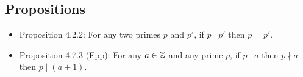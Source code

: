 \documentclass[a4paper]{article}
\begin{document}
\subsection{Propositions}
\begin{itemize}
	\item[] Proposition 4.2.2: For any two primes $p$ and $p'$, if $p\mid p'$ then $p=p'$.
	\item[] Proposition 4.7.3 (Epp): For any $a\in\mathbb{Z}$ and any prime $p$, if $p\mid a$ then $p\nmid a$ then $p\mid (a+1)$.
\end{itemize}
\end{document}
